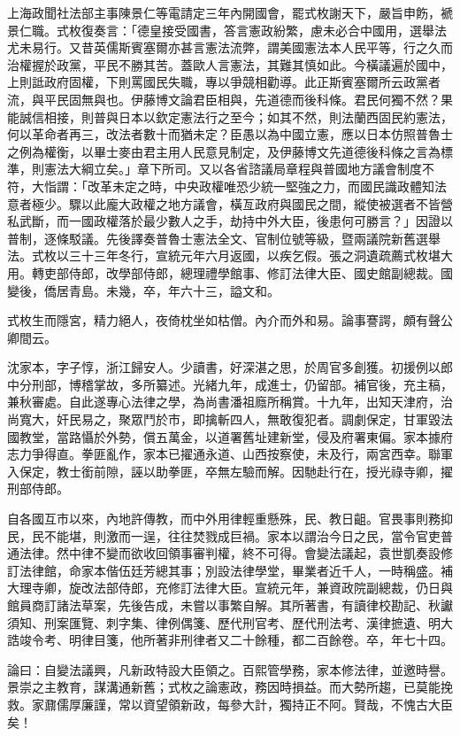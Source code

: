 \begin{pinyinscope}
上海政聞社法部主事陳景仁等電請定三年內開國會，罷式枚謝天下，嚴旨申飭，褫景仁職。式枚復奏言：「德皇接受國書，答言憲政紛繁，慮未必合中國用，選舉法尤未易行。又昔英儒斯賓塞爾亦甚言憲法流弊，謂美國憲法本人民平等，行之久而治權握於政黨，平民不勝其苦。蓋歐人言憲法，其難其慎如此。今橫議遍於國中，上則詆政府固權，下則罵國民失職，專以爭競相勸導。此正斯賓塞爾所云政黨者流，與平民固無與也。伊藤博文論君臣相與，先道德而後科條。君民何獨不然？果能誠信相接，則普與日本以欽定憲法行之至今；如其不然，則法蘭西固民約憲法，何以革命者再三，改法者數十而猶未定？臣愚以為中國立憲，應以日本仿照普魯士之例為權衡，以畢士麥由君主用人民意見制定，及伊藤博文先道德後科條之言為標準，則憲法大綱立矣。」章下所司。又以各省諮議局章程與普國地方議會制度不符，大恉謂：「改革未定之時，中央政權唯恐少統一堅強之力，而國民識政體知法意者極少。驟以此龐大政權之地方議會，橫亙政府與國民之間，縱使被選者不皆營私武斷，而一國政權落於最少數人之手，劫持中外大臣，後患何可勝言？」因證以普制，逐條駁議。先後譯奏普魯士憲法全文、官制位號等級，暨兩議院新舊選舉法。式枚以三十三年冬行，宣統元年六月返國，以疾乞假。張之洞遺疏薦式枚堪大用。轉吏部侍郎，改學部侍郎，總理禮學館事、修訂法律大臣、國史館副總裁。國變後，僑居青島。未幾，卒，年六十三，謚文和。

式枚生而隱宮，精力絕人，夜倚枕坐如枯僧。內介而外和易。論事謇諤，頗有聲公卿間云。

沈家本，字子惇，浙江歸安人。少讀書，好深湛之思，於周官多創獲。初援例以郎中分刑部，博稽掌故，多所纂述。光緒九年，成進士，仍留部。補官後，充主稿，兼秋審處。自此遂專心法律之學，為尚書潘祖廕所稱賞。十九年，出知天津府，治尚寬大，奸民易之，聚眾鬥於市，即擒斬四人，無敢復犯者。調劇保定，甘軍毀法國教堂，當路懾於外勢，償五萬金，以道署舊址建新堂，侵及府署東偏。家本據府志力爭得直。拳匪亂作，家本已擢通永道、山西按察使，未及行，兩宮西幸。聯軍入保定，教士銜前隙，誣以助拳匪，卒無左驗而解。因馳赴行在，授光祿寺卿，擢刑部侍郎。

自各國互市以來，內地許傳教，而中外用律輕重懸殊，民、教日齟。官畏事則務抑民，民不能堪，則激而一逞，往往焚戮成巨禍。家本以謂治今日之民，當令官吏普通法律。然中律不變而欲收回領事審判權，終不可得。會變法議起，袁世凱奏設修訂法律館，命家本偕伍廷芳總其事；別設法律學堂，畢業者近千人，一時稱盛。補大理寺卿，旋改法部侍郎，充修訂法律大臣。宣統元年，兼資政院副總裁，仍日與館員商訂諸法草案，先後告成，未嘗以事繁自解。其所著書，有讀律校勘記、秋讞須知、刑案匯覽、刺字集、律例偶箋、歷代刑官考、歷代刑法考、漢律摭遺、明大誥竣令考、明律目箋，他所著非刑律者又二十餘種，都二百餘卷。卒，年七十四。

論曰：自變法議興，凡新政特設大臣領之。百熙管學務，家本修法律，並邀時譽。景崇之主教育，謀溝通新舊；式枚之論憲政，務因時損益。而大勢所趨，已莫能挽救。家鼐儒厚廉謹，常以資望領新政，每參大計，獨持正不阿。賢哉，不愧古大臣矣！


\end{pinyinscope}